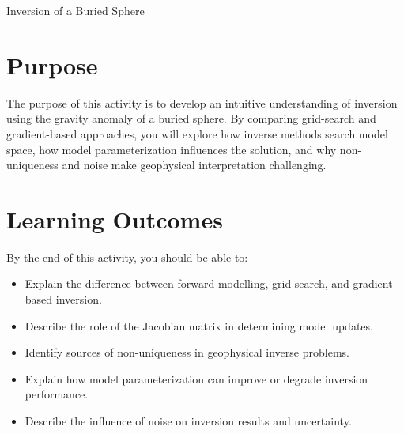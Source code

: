 \begin{activity}{Inversion of a Buried Sphere}

\section*{Purpose}

The purpose of this activity is to develop an intuitive understanding of inversion using the gravity anomaly of a buried sphere.  By comparing grid-search and gradient-based approaches, you will explore how inverse methods search model space, how model parameterization influences the solution, and why non-uniqueness and noise make geophysical interpretation challenging. 

\section*{Learning Outcomes}

By the end of this activity, you should be able to:
\begin{itemize}
    \item Explain the difference between forward modelling, grid search, and gradient-based inversion.
    \item Describe the role of the Jacobian matrix in determining model updates.
    \item Identify sources of non-uniqueness in geophysical inverse problems.
    \item Explain how model parameterization can improve or degrade inversion performance.
    \item Describe the influence of noise on inversion results and uncertainty.
\end{itemize}

\end{activity}
